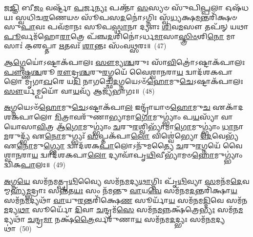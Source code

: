{%
{\anuvakamend[{\-\ul{𑌵𑌾}\-𑌯𑍁𑌸𑍍𑌤𑍇᳴ 𑌵𑌾\-\ul{𑌜𑌿}\-𑌨𑍍 𑌯𑍁𑌙𑍍𑌙\-\ul{𑌨𑍁} 𑌤𑍍𑌵𑌾 𑌰᳴𑌭𑍇 \ul{𑌸𑍍𑌵}\-𑌸𑍍𑌤𑌿 \ul{𑌮𑌾} 𑌸𑌨𑍍𑌤𑍍𑌰𑌿𑌚᳴𑌤𑍍𑌵𑌾𑌰𑌿𑍞𑌶𑌚𑍍𑌚}]}%

𑌜\-\ul{𑌜𑍍𑌞𑌿} 𑌬𑍀\-\ul{𑌜𑌂} 𑌵𑌰𑍍\mbox{}𑌷𑍍𑌟𑌾᳴ \ul{𑌪}\-𑌰𑍍𑌜\-\ul{𑌨𑍍𑌯𑌃} 𑌪𑌕𑍍𑌤𑌾᳴ \ul{𑌸}\-𑌸𑍍𑌯𑍞 𑌸𑍁᳴𑌪𑌿\-\ul{𑌪𑍍𑌪}\-𑌲𑌾 𑌓𑌷᳴𑌧𑌯𑌃 𑌸𑍍𑌵𑌧𑌿𑌚\-\ul{𑌰}\-𑌣𑍇𑌯𑍞 𑌸𑍂᳴𑌪𑌸\-\ul{𑌦}\-𑌨𑍋॑\-𑌽𑌗𑍍𑌨𑌿𑌃 𑌸𑍍𑌵᳴\-\ul{𑌧𑍍𑌯}\-𑌕𑍍𑌷\-\ul{𑌮}\-𑌨𑍍𑌤𑌰𑌿᳴𑌕𑍍𑌷𑍞 𑌸𑍁\-\ul{𑌪𑌾}\-𑌵𑌃 𑌪𑌵᳴𑌮𑌾𑌨𑌃 𑌸𑍂𑌪\-\ul{𑌸𑍍𑌥𑌾}\-𑌨𑌾 𑌦𑍍𑌯𑍗𑌃 \ul{𑌶𑌿}\-𑌵\-\ul{𑌮}\-𑌸𑍗 𑌤𑌪᳴𑌨𑍍 𑌯𑌥𑌾\-\ul{𑌪𑍂}\-𑌰𑍍𑌵𑌮᳴𑌹𑍋\-\ul{𑌰𑌾}\-𑌤𑍍𑌰𑍇 𑌪᳴𑌞𑍍𑌚\-\ul{𑌦}\-𑌶𑌿𑌨𑍋॑\-𑌽𑌰𑍍𑌧\-\ul{𑌮𑌾}\-𑌸𑌾\-\ul{𑌸𑍍𑌤𑍍𑌰𑌿}\-\-\ul{𑍞}\-𑌶𑌿\-\ul{𑌨𑍋} 𑌮𑌾𑌸𑌾𑌃॑ 𑌕𑍢॒𑌪𑍍𑌤𑌾 \ul{𑌋}\-𑌤𑌵𑌃᳴ \ul{𑌶𑌾}\-𑌨𑍍𑌤𑌃 𑌸𑌂᳴𑌵\-\ul{𑌥𑍍𑌸}\-𑌰𑌃॥~(47)

{\anuvakamend[{𑌜\-\ul{𑌜𑍍𑌞𑌿} 𑌬𑍀\-\ul{𑌜}\-𑌮𑍇𑌕᳴𑌤𑍍𑌰𑌿𑍞𑌶𑌤𑍍}]}%

\-\ul{𑌆}\-\-\ul{𑌗𑍍𑌨𑍇}\-𑌯𑍋॑\-𑌽𑌷𑍍𑌟𑌾𑌕᳴𑌪𑌾𑌲𑌃 \ul{𑌸𑍗}\-𑌮𑍍𑌯\-\ul{𑌶𑍍𑌚}\-𑌰𑍁𑌃 𑌸𑌾᳴\-\ul{𑌵𑌿}\-𑌤𑍍𑌰𑍋॑\-𑌽𑌷𑍍𑌟𑌾𑌕᳴𑌪𑌾𑌲𑌃 \ul{𑌪𑍗}\-𑌷𑍍𑌣\-\ul{𑌶𑍍𑌚}\-𑌰𑍂 \ul{𑌰𑍗}\-𑌦𑍍𑌰\-\ul{𑌶𑍍𑌚}\-𑌰𑍁\-\ul{𑌰}\-𑌗𑍍𑌨𑌯𑍇᳴ 𑌵𑍈𑌶𑍍𑌵𑌾\-\ul{𑌨}\-𑌰𑌾\-\ul{𑌯} 𑌦𑍍𑌵𑌾𑌦᳴𑌶\-𑌕𑌪𑌾𑌲𑍋 𑌮𑍃𑌗𑌾\-\ul{𑌖}\-𑌰𑍇 𑌯\-\ul{𑌦𑌿} 𑌨𑌾𑌗𑌚𑍍𑌛𑍇᳴\-\ul{𑌦}\-𑌗𑍍𑌨𑌯𑍇\-𑌽𑍞᳴\-\ul{𑌹𑍋}\-𑌮𑍁\-\ul{𑌚𑍇}\-\-𑌽𑌷𑍍𑌟𑌾𑌕᳴𑌪𑌾𑌲𑌃 \ul{𑌸𑍗}\-𑌰𑍍𑌯𑌮𑍍𑌪𑌯𑍋᳴ 𑌵𑌾\-\ul{𑌯}\-𑌵𑍍𑌯᳴ 𑌆𑌜𑍍𑌯᳴𑌭𑌾𑌗𑌃॥~(48)

{\anuvakamend[{\-\ul{𑌆}\-\-\ul{𑌗𑍍𑌨𑍇}\-𑌯𑌶𑍍𑌚𑌤𑍁᳴𑌰𑍍𑌵𑌿𑍞𑌶𑌤𑌿𑌃}]}%

\-\ul{𑌅}\-𑌗𑍍𑌨𑌯𑍇\-𑌽𑍞᳴\-\ul{𑌹𑍋}\-𑌮𑍁\-\ul{𑌚𑍇}\-\-𑌽𑌷𑍍𑌟𑌾𑌕᳴𑌪𑌾\-\ul{𑌲} 𑌇𑌨𑍍𑌦𑍍𑌰𑌾᳴𑌯𑌾𑍞\-\ul{𑌹𑍋}\-𑌮𑍁\-\ul{𑌚} 𑌏𑌕𑌾᳴\-𑌦𑌶\-𑌕𑌪𑌾𑌲𑍋 \ul{𑌮𑌿}\-𑌤𑍍𑌰𑌾𑌵𑌰𑍁᳴𑌣𑌾𑌭𑍍𑌯𑌾𑌮𑌾\-\ul{𑌗𑍋}\-𑌮𑍁𑌗𑍍\-𑌭𑍍𑌯𑌾𑌂॑ 𑌪\-\ul{𑌯}\-𑌸𑍍𑌯𑌾᳴ 𑌵𑌾𑌯𑍋𑌸𑌾\-\ul{𑌵𑌿}\-𑌤𑍍𑌰 𑌆᳴\-\ul{𑌗𑍋}\-𑌮𑍁𑌗𑍍\-𑌭𑍍𑌯𑌾𑌂॑ \ul{𑌚}\-𑌰𑍁\-\ul{𑌰}\-𑌶𑍍𑌵𑌿𑌭𑍍𑌯𑌾᳴𑌮𑌾\-\ul{𑌗𑍋}\-𑌮𑍁𑌗𑍍\-𑌭𑍍𑌯𑌾𑌂॑ \ul{𑌧𑌾}\-𑌨𑌾 \ul{𑌮}\-𑌰𑍁𑌦𑍍𑌭𑍍𑌯᳴ 𑌏\-\ul{𑌨𑍋}\-𑌮𑍁𑌗𑍍𑌭𑍍𑌯𑌃᳴ \ul{𑌸}\-𑌪𑍍𑌤𑌕᳴𑌪𑌾\-\ul{𑌲𑍋} 𑌵𑌿𑌶𑍍𑌵𑍇॑𑌭𑍍𑌯𑍋 \ul{𑌦𑍇}\-𑌵𑍇𑌭𑍍𑌯᳴ 𑌏\-\ul{𑌨𑍋}\-𑌮𑍁\-\ul{𑌗𑍍𑌭𑍍𑌯𑍋} 𑌦𑍍𑌵𑌾𑌦᳴𑌶\-𑌕\-\ul{𑌪𑌾}\-𑌲𑍋\-𑌽𑌨𑍁᳴𑌮𑌤𑍍𑌯𑍈 \ul{𑌚}\-𑌰𑍁\-\ul{𑌰}\-𑌗𑍍𑌨𑌯𑍇᳴ 𑌵𑍈𑌶𑍍𑌵𑌾\-\ul{𑌨}\-𑌰𑌾\-\ul{𑌯} 𑌦𑍍𑌵𑌾𑌦᳴𑌶\-𑌕𑌪𑌾\-\ul{𑌲𑍋} 𑌦𑍍𑌯𑌾𑌵𑌾᳴𑌪𑍃\-\ul{𑌥𑌿}\-𑌵𑍀𑌭𑍍𑌯𑌾᳴𑌮𑍞\-\ul{𑌹𑍋}\-𑌮𑍁𑌗𑍍\-𑌭𑍍𑌯𑌾𑌂॑ 𑌦𑍍𑌵𑌿𑌕\-\ul{𑌪𑌾}\-𑌲𑌃॥~(49)

{\anuvakamend[{\-\ul{𑌅}\-𑌗𑍍𑌨𑌯𑍇\-𑌽𑍞᳴\-\ul{𑌹𑍋}\-𑌮𑍁𑌚𑍇॑ \ul{𑌤𑍍𑌰𑌿}\-\-\ul{𑍞}\-𑌶𑌤𑍍}]}%

\-\ul{𑌅}\-𑌗𑍍𑌨\-\ul{𑌯𑍇} 𑌸𑌮᳴𑌨𑌮𑌤𑍍𑌪𑍃\-\ul{𑌥𑌿}\-𑌵𑍍𑌯𑍈 𑌸𑌮᳴𑌨\-\ul{𑌮}\-𑌦𑍍𑌯\-\ul{𑌥𑌾}\-𑌗𑍍𑌨𑌿𑌃 𑌪𑍃᳴\-\ul{𑌥𑌿}\-𑌵𑍍𑌯𑌾 \ul{𑌸}\-𑌮𑌨᳴𑌮\-\ul{𑌦𑍇}\-𑌵𑌮𑍍𑌮𑌹𑍍𑌯᳴\-\ul{𑌮𑍍𑌭}\-𑌦𑍍𑌰𑌾𑌃 𑌸𑌨𑍍𑌨᳴𑌤\-\ul{𑌯𑌃} 𑌸𑌂 𑌨᳴𑌮𑌨𑍍𑌤𑍁 \ul{𑌵𑌾}\-𑌯\-\ul{𑌵𑍇} 𑌸𑌮᳴𑌨𑌮\-\ul{𑌦}\-𑌨𑍍𑌤𑌰𑌿᳴𑌕𑍍𑌷𑌾\-\ul{𑌯} 𑌸𑌮᳴𑌨\-\ul{𑌮}\-𑌦𑍍𑌯𑌥𑌾᳴ \ul{𑌵𑌾}\-𑌯𑍁\-\ul{𑌰}\-𑌨𑍍𑌤𑌰𑌿᳴𑌕𑍍𑌷𑍇\-\ul{𑌣} 𑌸𑍂𑌰𑍍𑌯𑌾᳴\-\ul{𑌯} 𑌸𑌮᳴𑌨𑌮\-\ul{𑌦𑍍𑌦𑌿}\-𑌵𑍇 𑌸𑌮᳴𑌨\-\ul{𑌮}\-𑌦𑍍𑌯\-\ul{𑌥𑌾} 𑌸𑍂𑌰𑍍𑌯𑍋᳴ \ul{𑌦𑌿}\-𑌵𑌾 \ul{𑌚}\-𑌨𑍍𑌦𑍍𑌰𑌮᳴\-\ul{𑌸𑍇} 𑌸𑌮᳴𑌨\-\ul{𑌮}\-𑌨𑍍𑌨𑌕𑍍𑌷᳴𑌤𑍍𑌰𑍇\-\ul{𑌭𑍍𑌯𑌃} 𑌸𑌮᳴𑌨\-\ul{𑌮}\-𑌦𑍍𑌯𑌥𑌾᳴ \ul{𑌚}\-𑌨𑍍𑌦𑍍𑌰\-\ul{𑌮𑌾} 𑌨𑌕𑍍𑌷᳴\-\ul{𑌤𑍍𑌰𑍈}\-𑌰𑍍𑌵𑌰𑍁᳴𑌣𑌾\-\ul{𑌯} 𑌸𑌮᳴𑌨𑌮\-\ul{𑌦}\-𑌦𑍍𑌭𑍍𑌯𑌃 𑌸𑌮᳴𑌨\-\ul{𑌮}\-𑌦𑍍𑌯𑌥𑌾॑~(50)

}
